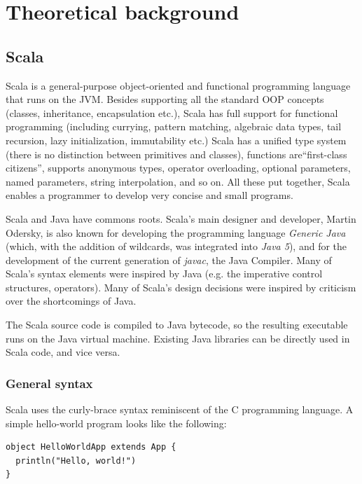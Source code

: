 
\chapter{Theoretical background}\label{chap:theory}


\section{Scala}\label{sec:theory_scala}

Scala is a general-purpose object-oriented and functional programming language that runs on the JVM. Besides supporting all the standard OOP concepts (classes, inheritance, encapsulation etc.), Scala has full support for functional programming (including currying, pattern matching, algebraic data types, tail recursion, lazy initialization, immutability etc.) Scala has a unified type system (there is no distinction between primitives and classes), functions are``first-class citizens'', supports anonymous types, operator overloading, optional parameters, named parameters, string interpolation, and so on. All these put together, Scala enables a programmer to develop very concise and small programs.

Scala and Java have commons roots. Scala's main designer and developer, Martin Odersky, is also known for developing the programming language \emph{Generic Java} (which, with the addition of wildcards, was integrated into \emph{Java 5}), and for the development of the current generation of \emph{javac}, the Java Compiler. Many of Scala's syntax elements were inspired by Java (e.g. the imperative control structures, operators). Many of Scala's design decisions were inspired by criticism over the shortcomings of Java. \cite{OderskyEtAl2004}

The Scala source code is compiled to Java bytecode, so the resulting executable runs on the Java virtual machine. Existing Java libraries can be directly used in Scala code, and vice versa. 

\subsection{General syntax}

Scala uses the curly-brace syntax reminiscent of the C programming language. A simple hello-world program looks like the following:

\begin{lstlisting}
object HelloWorldApp extends App {
  println("Hello, world!")
}
\end{lstlisting}

